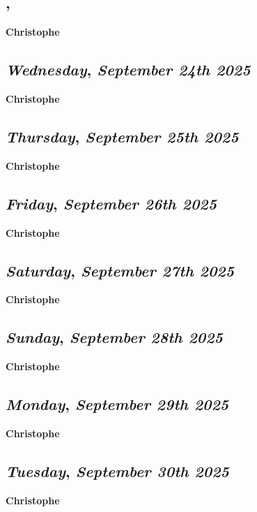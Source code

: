 \subsection*{\weekday, \day}
\textbf {Christophe}

\def\day{\textit{September 24th 2025}}
\def\weekday{\textit{Wednesday}}
\subsection*{\weekday, \day}
\textbf {Christophe}

\def\day{\textit{September 25th 2025}}
\def\weekday{\textit{Thursday}}
\subsection*{\weekday, \day}
\textbf {Christophe}

\def\day{\textit{September 26th 2025}}
\def\weekday{\textit{Friday}}
\subsection*{\weekday, \day}
\textbf {Christophe}

\def\day{\textit{September 27th 2025}}
\def\weekday{\textit{Saturday}}
\subsection*{\weekday, \day}
\textbf {Christophe}

\def\day{\textit{September 28th 2025}}
\def\weekday{\textit{Sunday}}
\subsection*{\weekday, \day}
\textbf {Christophe}

\def\day{\textit{September 29th 2025}}
\def\weekday{\textit{Monday}}
\subsection*{\weekday, \day}
\textbf {Christophe}

\def\day{\textit{September 30th 2025}}
\def\weekday{\textit{Tuesday}}
\subsection*{\weekday, \day}
\textbf {Christophe}
